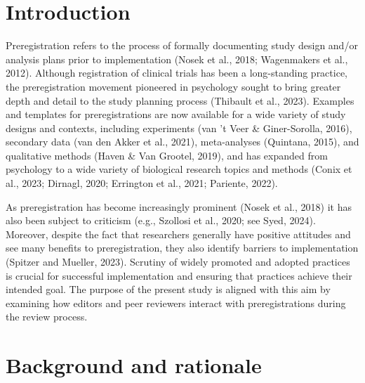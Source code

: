 \documentclass[authordate, meta]{jote-new-article}
\author[1]{\mbox{Moin Syed\orcid{0000-0003-4759-3555}}}
\affil[1]{University of Minnesota, Minneapolis, United States}
\begin{document}
\begin{frontmatter}
  \maketitle
  \begin{abstract}
    \printabstracttext
  \end{abstract}
\end{frontmatter}





	\section{\textbf{Introduction}}



	Preregistration refers to the process of formally documenting study design and/or analysis plans prior to implementation (Nosek et al., 2018; Wagenmakers et al., 2012). Although registration of clinical trials has been a long-standing practice, the preregistration movement pioneered in psychology sought to bring greater depth and detail to the study planning process (Thibault et al., 2023). Examples and templates for preregistrations are now available for a wide variety of study designs and contexts, including experiments (van 't Veer \& Giner-Sorolla, 2016), secondary data (van den Akker et al., 2021), meta-analyses (Quintana, 2015), and qualitative methods (Haven \& Van Grootel, 2019), and has expanded from psychology to a wide variety of biological research topics and methods (Conix et al., 2023; Dirnagl, 2020; Errington et al., 2021; Pariente, 2022).



	As preregistration has become increasingly prominent (Nosek et al., 2018) it has also been subject to criticism (e.g., Szollosi et al., 2020; see Syed, 2024). Moreover, despite the fact that researchers generally have positive attitudes and see many benefits to preregistration, they also identify barriers to implementation (Spitzer and Mueller, 2023). Scrutiny of widely promoted and adopted practices is crucial for successful implementation and ensuring that practices achieve their intended goal. The purpose of the present study is aligned with this aim by examining how editors and peer reviewers interact with preregistrations during the review process.



	\section{\textbf{Background and rationale}}
\end{document}
